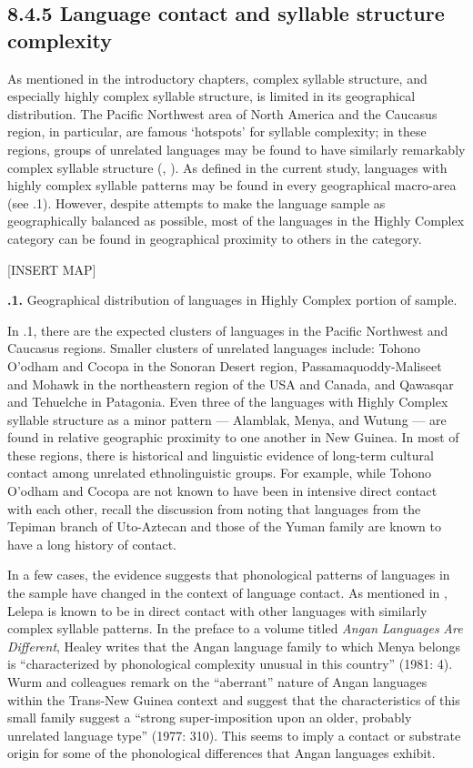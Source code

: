 \subsection{8.4.5 Language contact and syllable structure complexity}

  As mentioned in the introductory chapters, complex syllable structure, and especially highly complex syllable structure, is limited in its geographical distribution. The Pacific Northwest area of North America and the Caucasus region, in particular, are famous ‘hotspots’ for syllable complexity; in these regions, groups of unrelated languages may be found to have similarly remarkably complex syllable structure (\citealt{Chirikba2008}, \citealt{ThompsonKinkade1990}). As defined in the current study, languages with highly complex syllable patterns may be found in every geographical macro-area (see .1). However, despite attempts to make the language sample as geographically balanced as possible, most of the languages in the Highly Complex category can be found in geographical proximity to others in the category.

[INSERT MAP]

\textbf{.1.} Geographical distribution of languages in Highly Complex portion of sample.

  In .1, there are the expected clusters of languages in the Pacific Northwest and Caucasus regions. Smaller clusters of unrelated languages include: Tohono O’odham and Cocopa in the Sonoran Desert region, Passamaquoddy-Maliseet and Mohawk in the northeastern region of the USA and Canada, and Qawasqar and Tehuelche in Patagonia. Even three of the languages with Highly Complex syllable structure as a minor pattern — Alamblak, Menya, and Wutung — are found in relative geographic proximity to one another in New Guinea. In most of these regions, there is historical and linguistic evidence of long-term cultural contact among unrelated ethnolinguistic groups. For example, while Tohono O’odham and Cocopa are not known to have been in intensive direct contact with each other, recall the discussion from  noting that languages from the Tepiman branch of Uto-Aztecan and those of the Yuman family are known to have a long history of contact. 

  In a few cases, the evidence suggests that phonological patterns of languages in the sample have changed in the context of language contact. As mentioned in , Lelepa is known to be in direct contact with other languages with similarly complex syllable patterns. In the preface to a volume titled \textit{Angan} \textit{Languages} \textit{Are} \textit{Different}, Healey writes that the Angan language family to which Menya belongs is “characterized by phonological complexity unusual in this country” (1981: 4). Wurm and colleagues remark on the “aberrant” nature of Angan languages within the Trans-New Guinea context and suggest that the characteristics of this small family suggest a “strong super-imposition upon an older, probably unrelated language type” (1977: 310). This seems to imply a contact or substrate origin for some of the phonological differences that Angan languages exhibit.

